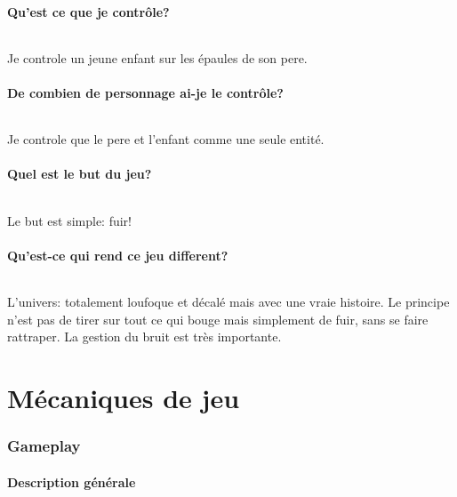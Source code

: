 \documentclass[a4paper,10pt]{article}
\begin{document}
		\subsection{Qu'est ce que je contrôle?}
			\paragraph{} Je controle un jeune enfant sur les épaules de son 
pere.

			\subsection{De combien de personnage ai-je le contrôle?}
			\paragraph{} Je controle que le pere et l'enfant comme une seule 
entité.

		\subsection{Quel est le but du jeu?}
			\paragraph{} Le but est simple: fuir!

		\subsection{Qu'est-ce qui rend ce jeu different?}
			\paragraph{} L'univers: totalement loufoque et décalé mais avec 
		une vraie histoire. Le principe n'est pas de tirer sur tout ce qui 
bouge mais simplement de fuir, sans se faire rattraper. La gestion du bruit 
est très importante. 

\part{Mécaniques de jeu} %
	\section{Gameplay}%
		\subsection{Description générale}
\end{document}
